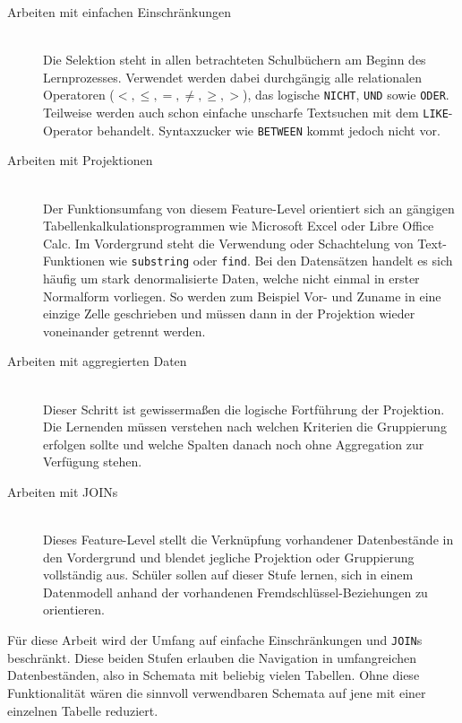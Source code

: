\begin{description}
\item[Arbeiten mit einfachen Einschränkungen] \hfill \\
  Die Selektion steht in allen betrachteten Schulbüchern am Beginn des Lernprozesses. Verwendet werden dabei durchgängig alle relationalen Operatoren ($<, \leq, =, \neq, \geq, >$), das logische \lstinline{NICHT}, \lstinline{UND} sowie \lstinline{ODER}. Teilweise werden auch schon einfache unscharfe Textsuchen mit dem \lstinline{LIKE}-Operator behandelt. Syntaxzucker wie \lstinline{BETWEEN} kommt jedoch nicht vor.

\item[Arbeiten mit Projektionen] \hfill \\
  Der Funktionsumfang von diesem Feature-Level orientiert sich an gängigen Tabellenkalkulationsprogrammen wie Microsoft Excel oder Libre Office Calc. Im Vordergrund steht die Verwendung oder Schachtelung von Text-Funktionen wie \lstinline{substring} oder \lstinline{find}. Bei den Datensätzen handelt es sich häufig um stark denormalisierte Daten, welche nicht einmal in erster Normalform vorliegen. So werden zum Beispiel Vor- und Zuname in eine einzige Zelle geschrieben und müssen dann in der Projektion wieder voneinander getrennt werden.

\item[Arbeiten mit aggregierten Daten] \hfill \\
  Dieser Schritt ist gewissermaßen die logische Fortführung der Projektion. Die Lernenden müssen verstehen nach welchen Kriterien die Gruppierung erfolgen sollte und welche Spalten danach noch ohne Aggregation zur Verfügung stehen.

\item[Arbeiten mit JOINs] \hfill \\
  Dieses Feature-Level stellt die Verknüpfung vorhandener Datenbestände in den Vordergrund und blendet jegliche Projektion oder Gruppierung vollständig aus. Schüler sollen auf dieser Stufe lernen, sich in einem Datenmodell anhand der vorhandenen Fremdschlüssel-Beziehungen zu orientieren.
\end{description}

Für diese Arbeit wird der Umfang auf einfache Einschränkungen und \texttt{JOIN}s beschränkt. Diese beiden Stufen erlauben die Navigation in umfangreichen Datenbeständen, also in Schemata mit beliebig vielen Tabellen. Ohne diese Funktionalität wären die sinnvoll verwendbaren Schemata auf jene mit einer einzelnen Tabelle reduziert.

